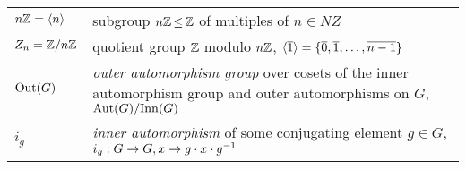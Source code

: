 \begin{fullwidth}
\begin{longtable}{p{2cm}l}
    $n\mathbb{Z} = \langle n \rangle$ & subgroup $n\mathbb{Z} \operatorname*{\leq} \mathbb{Z}$ of multiples of $n \in NZ$ \\
    $Z_n = \mathbb{Z}/n\mathbb{Z}$ & quotient group $\mathbb{Z}$ modulo $n\mathbb{Z}$, $\langle \overline{1} \rangle = \{\overline{0}, \overline{1}, \dots, \overline{n-1}\}$ \\
    $\mathrm{Out}(G)$ & \makecell[tl]{\emph{outer automorphism group} over cosets of the inner automorphism group and \\ outer automorphisms on $G$, $\mathrm{Aut}(G)/\mathrm{Inn}(G)$} \\
    \addlinespace
    $i_g$ & \emph{inner automorphism} of some conjugating element $g \in G$, $i_g : G \to G, x \to g \cdot x \cdot g^{-1}$ \\
\end{longtable}
\end{fullwidth}
